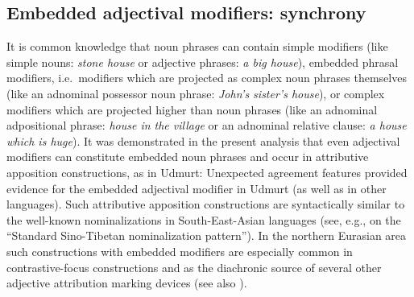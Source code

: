 \subsection{Embedded adjectival modifiers: synchrony} \label{embeddedsynchr}
It is common knowledge that noun phrases can contain simple modifiers (like simple nouns: \textit{stone house} or adjective phrases: \textit{a big house}), embedded phrasal modifiers, i.e.~modifiers which are projected as complex noun phrases themselves (like an adnominal possessor noun phrase: \textit{John's sister's house}), or complex modifiers which are projected higher than noun phrases (like an adnominal adpositional phrase: \textit{house in the village} or an adnominal relative clause: \textit{a house which is huge}). It was demonstrated in the present analysis that even adjectival modifiers can constitute embedded noun phrases and occur in attributive apposition constructions, as in Udmurt:
Unexpected agreement features provided evidence for the embedded adjectival modifier in Udmurt (as well as in other languages). Such attributive apposition constructions are syntactically similar to the well-known nominalizations in South-East-Asian languages (see, e.g., \citealt{bickel1999} on the “Standard Sino-Tibetan nominalization pattern”). In the northern Eurasian area such constructions with embedded modifiers are especially  common in contrastive-focus constructions and as the diachronic source of several other adjective attribution marking devices (see also ). 

